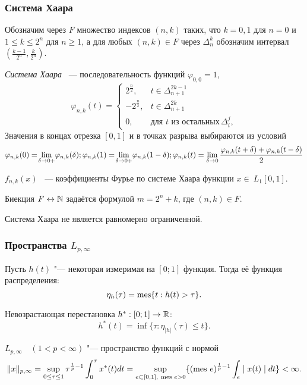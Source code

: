 \begin{frame}\frametitle{Система Хаара}
	\label{page:Haar}


Обозначим через $F$ множество индексов $(n,k)$ таких, что
$k=0,1$ для $n=0$ и $1\leq k \leq 2^n$ для $n\geq 1$, а для любых
$(n,k)\in F$ через $\Delta_n^k$ обозначим интервал $
(\frac{k-1}{2^n},\frac{k}{2^n})$.

\emph{Система Хаара} ~--- последовательность функций $\varphi_{0,0}=1$,
$$\varphi_{n,k} (t)=\begin{cases} 2^\frac{n}2, &t\in \Delta_{n+1}^{2k-1}\\
-2^\frac{n}2, &t\in \Delta_{n+1}^{2k}\\0,  &\text{для} \,\, t \,\,
\text{из остальных} \, \Delta_i^j,
\end{cases}$$
Значения в концах отрезка $[0,1]$ и в
точках разрыва выбираются из условий
\begin{equation}
	\varphi_{n,k} (0)= \!\lim_{\delta \to 0+}\!\varphi_{n,k}
	(\delta);
	\hfill
	\varphi_{n,k} (1)= \!\lim_{\delta \to
	0+}\!\varphi_{n,k} (1-\delta);
	\hfill
	\varphi_{n,k} (t)= \lim_{\delta \to 0}\frac{\varphi_{n,k}
	(t+\delta)+\varphi_{n,k} (t-\delta)}2
\end{equation}


$f_{n,k}(x)$ ~--- коэффициенты Фурье по
системе Хаара функции $x\in~L_1 [0,1]$.

Биекция $F \leftrightarrow \mathbb{N}$ задаётся формулой
$m=2^n+k$, где
$(n,k)\in F$.

\vfill

Система Хаара не является равномерно ограниченной.

\end{frame}

\begin{frame}\frametitle{Пространства $L_{p,\infty}$}

	Пусть $h(t)$ "--- некоторая измеримая на $[0;1]$ функция.
	Тогда её функция распределения:
	\begin{equation}
		\eta_h(\tau) = \operatorname{mes} \{t : h(t) > \tau \}
		.
	\end{equation}

	Невозрастающая перестановка $h^* : [0;1] \to \mathbb{R}$:
	\begin{equation}
		h^*(t) = \inf\{\tau: \eta_{|h|}(\tau) \leq t \}.
	\end{equation}


	$L_{p,\infty}\quad(1<p<\infty)$ "--- пространство
	функций с нормой
	\begin{equation}
		\| x \|_{p,\infty}=\sup\limits_{0\leq \tau \leq
		1} \tau^{\frac{1}{p}-1}\int_0^\tau  x^*(t)dt =
		\sup_{e\subset[0,1], \ \operatorname{mes}\, e > 0}
		\{(\operatorname{mes}\, e)^{\frac{1}{p}-1}\int_e \mid x(t)\mid dt\}<\infty
		.
	\end{equation}


\end{frame}

